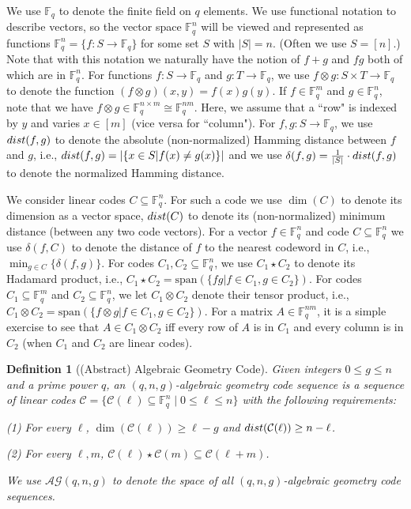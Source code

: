 \documentclass[11pt]{article}
\newcommand{\F}{\mathbb{F}}
\newcommand{\C}{\mathcal{C}}
\newcommand{\AG}{\mathcal{AG}}
\newcommand{\mspan}{\mathrm{span}}
\newtheorem{definition}[theorem]{Definition}
\newcommand{\dist}{\mathop{\rm dist}}
\begin{document}
We use $\F_q$ to denote the finite field on $q$ elements. 
We use functional notation to describe vectors, so the vector space $\F_q^n$ will be viewed and represented as functions $\F_q^n = \{f:S\to \F_q\}$ for some set $S$ with $|S| = n$. (Often we use $S = [n]$.) Note that with this notation we naturally have the notion of $f+g$ and $fg$ both of which are in $\F_q^n$. For functions $f:S \to \F_q$ and $g:T \to \F_q$, we use $f \otimes g: S \times T \to \F_q$ to denote the function $(f\otimes g)(x,y) = f(x)g(y)$. If $f\in \F_q^m$ and $g \in \F_q^n$, note that we have $f \otimes g \in \F_q^{n \times m} \cong \F_q^{nm}$. Here, we assume that a ``row" is indexed by $y$ and varies $x\in [m]$ (vice versa for ``column").
For $f,g:S \to \F_q$,  we use $\dist(f,g)$ to denote the absolute (non-normalized) Hamming distance between $f$ and $g$, i.e., $\dist(f,g) = |\{x \in S | f(x) \ne g(x) \}|$ and we use $\delta(f,g) = \frac{1}{|S|} \cdot \dist(f,g)$ to denote the normalized Hamming distance.

We consider linear codes $C \subseteq \F_q^n$. For such a code we use $\dim(C)$ to denote its dimension as a vector space, $\dist(C)$ to denote its (non-normalized) minimum distance (between any two code vectors). For a vector $f \in \F_q^n$ and code $C \subseteq \F_q^n$ we use $\delta(f,C)$ to denote the distance of $f$ to the nearest codeword in $C$, i.e., $\min_{g \in C} \{\delta(f,g)\}$. 
For codes $C_1, C_2 \subseteq \F_q^n$, we use $C_1 \star C_2$ to denote its Hadamard product, i.e., $C_1 \star C_2 = \mspan(\{fg | f \in C_1, g \in C_2\})$. For codes $C_1 \subseteq \F_q^m$ and $C_2 \subseteq \F_q^n$, we let $C_1 \otimes C_2$ denote their tensor product, i.e.,  $C_1 \otimes C_2 = \mspan(\{f \otimes g | f \in C_1, g \in C_2\})$. For a matrix $A\in \F_q^{nm}$, it is a simple exercise to see that $A\in C_1 \otimes C_2$ iff every row of $A$ is in $C_1$ and every column is in $C_2$ (when $C_1$ and $C_2$ are linear codes).

\begin{definition}[(Abstract) Algebraic Geometry Code]\label{def:ag-codes} Given integers $0\leq g \leq n$ and a prime power $q$, an $(q,n,g)$-algebraic geometry code sequence is a sequence of linear codes $\C = \{\C(\ell) \subseteq \F_q^n \mid 0 \leq \ell \leq n\}$ with the following requirements: 

(1) For every $\ell$, $\dim(\C(\ell)) \geq \ell-g$ and $\dist(\C(\ell)) \geq n-\ell$. 

(2) For every $\ell, m$, $\C(\ell) \star \C(m) \subseteq \C(\ell+m)$.

We use $\AG(q,n,g)$ to denote the space of all $(q,n,g)$-algebraic geometry code sequences.
\end{definition}
\end{document}
